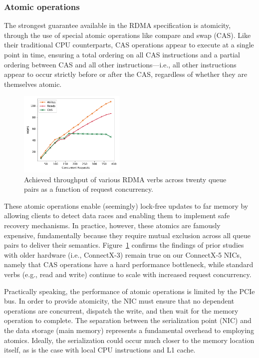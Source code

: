 \subsubsection{Atomic operations}

The strongest guarantee available in the RDMA specification is
atomicity, through the use of special atomic operations like compare
and swap (CAS).  Like their traditional CPU counterparts, CAS
operations appear to execute at a single point in time, ensuring a
total ordering on all CAS instructions and a partial ordering between
CAS and all other instructions---i.e., all other instructions appear
to occur strictly before or after the CAS, regardless of whether they
are themselves atomic.

\begin{figure}[t]
    \includegraphics[width=0.45\textwidth]{fig/rdma_concur.pdf}
    \caption{Achieved throughput of various RDMA verbs across twenty queue pairs as a function of request concurrency.}
    \label{fig:rdma_concur}
\end{figure}

These atomic operations enable (seemingly) lock-free updates to far
memory by allowing clients to detect data races and enabling them to
implement safe recovery mechanisms. In practice, however, these
atomics are famously~\cite{design-guidelines,clover} expensive,
fundamentally because they require mutual exclusion across all queue
pairs to deliver their semantics.  Figure~\ref{fig:rdma_concur}
confirms the findings of prior
studies~\cite[Fig. 14]{design-guidelines} with older hardware (i.e.,
ConnectX-3) remain true on our ConnectX-5 NICs, namely that CAS
operations have a hard performance bottleneck, while standard verbs
(e.g., read and write) continue to scale with increased request
concurrency.

Practically speaking, the performance of atomic operations is limited
by the PCIe bus.  In order to provide atomicity, the NIC must ensure
that no dependent operations are concurrent, dispatch the write, and
then wait for the memory operation to complete.  The separation
between the serialization point (NIC) and the data storage (main
memory) represents a fundamental overhead to employing atomics.
Ideally, the serialization could occur much closer to the memory
location itself, as is the case with local CPU instructions and L1
cache.

